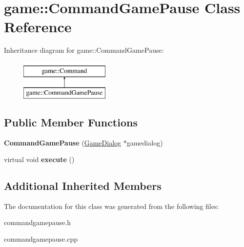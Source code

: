 \hypertarget{classgame_1_1CommandGamePause}{}\section{game\+:\+:Command\+Game\+Pause Class Reference}
\label{classgame_1_1CommandGamePause}
Inheritance diagram for game\+:\+:Command\+Game\+Pause\+:\begin{figure}[H]
\begin{center}
\leavevmode
\includegraphics[height=2.000000cm]{classgame_1_1CommandGamePause}
\end{center}
\end{figure}
\subsection*{Public Member Functions}
\begin{DoxyCompactItemize}
\item 
\mbox{\label{classgame_1_1CommandGamePause_a033daa0923ecfc63619961a72b67e2cc}} 
{\bfseries Command\+Game\+Pause} (\hyperlink{classgame_1_1GameDialog}{Game\+Dialog} $\ast$gamedialog)
\item 
\mbox{\label{classgame_1_1CommandGamePause_ae5a44637c33c29589300cf2e898506d5}} 
virtual void {\bfseries execute} ()
\end{DoxyCompactItemize}
\subsection*{Additional Inherited Members}


The documentation for this class was generated from the following files\+:\begin{DoxyCompactItemize}
\item 
commandgamepause.\+h\item 
commandgamepause.\+cpp\end{DoxyCompactItemize}
